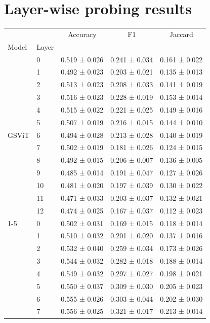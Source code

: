 \documentclass[11pt, a4paper]{article}
\begin{document}
\section{Layer-wise probing results}\label{app:d}

\begin{table}
\centering
\begin{tabular}{llccc}
\toprule
 &  & Accuracy & F1 & Jaccard \\
Model & Layer &  &  &  \\
\midrule
\multirow[t]{13}{*}{GSViT} & 0 & 0.519 ± 0.026 & 0.241 ± 0.034 & 0.161 ± 0.022 \\
 & 1 & 0.492 ± 0.023 & 0.203 ± 0.021 & 0.135 ± 0.013 \\
 & 2 & 0.513 ± 0.023 & 0.208 ± 0.033 & 0.141 ± 0.019 \\
 & 3 & 0.516 ± 0.023 & 0.228 ± 0.019 & 0.153 ± 0.014 \\
 & 4 & 0.515 ± 0.022 & 0.221 ± 0.025 & 0.149 ± 0.016 \\
 & 5 & 0.507 ± 0.019 & 0.216 ± 0.015 & 0.144 ± 0.010 \\
 & 6 & 0.494 ± 0.028 & 0.213 ± 0.028 & 0.140 ± 0.019 \\
 & 7 & 0.502 ± 0.019 & 0.181 ± 0.026 & 0.124 ± 0.015 \\
 & 8 & 0.492 ± 0.015 & 0.206 ± 0.007 & 0.136 ± 0.005 \\
 & 9 & 0.485 ± 0.014 & 0.191 ± 0.047 & 0.127 ± 0.026 \\
 & 10 & 0.481 ± 0.020 & 0.197 ± 0.039 & 0.130 ± 0.022 \\
 & 11 & 0.471 ± 0.033 & 0.203 ± 0.037 & 0.132 ± 0.021 \\
 & 12 & 0.474 ± 0.025 & 0.167 ± 0.037 & 0.112 ± 0.023 \\
\cline{1-5}
\multirow[t]{13}{*}{LeJEPA} & 0 & 0.502 ± 0.031 & 0.169 ± 0.015 & 0.118 ± 0.014 \\
 & 1 & 0.510 ± 0.032 & 0.201 ± 0.020 & 0.137 ± 0.016 \\
 & 2 & 0.532 ± 0.040 & 0.259 ± 0.034 & 0.173 ± 0.026 \\
 & 3 & 0.544 ± 0.032 & 0.282 ± 0.018 & 0.188 ± 0.014 \\
 & 4 & 0.549 ± 0.032 & 0.297 ± 0.027 & 0.198 ± 0.021 \\
 & 5 & 0.550 ± 0.037 & 0.309 ± 0.030 & 0.205 ± 0.023 \\
 & 6 & 0.555 ± 0.026 & 0.303 ± 0.044 & 0.202 ± 0.030 \\
 & 7 & 0.556 ± 0.025 & 0.321 ± 0.017 & 0.213 ± 0.014 \\

\end{tabular}
\end{table}
\end{document}
